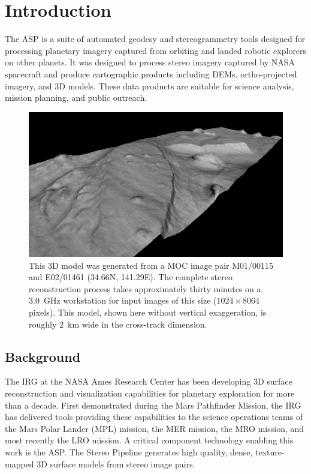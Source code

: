 \chapter{Introduction}

\acresetall

The  \ac{ASP} is a suite of automated geodesy and
stereogrammetry tools designed for processing planetary imagery
captured from orbiting and landed robotic explorers on other planets.
It was designed to process stereo imagery captured by \ac{NASA}
spacecraft and produce cartographic products including \acp{DEM},
ortho-projected imagery, and 3D models.  These data products are
suitable for science analysis, mission planning, and public outreach.

\begin{figure}[tb]
   \centering
   \includegraphics[width=6.5in]{images/introduction/p19view2.png}
   \caption{This 3D model was generated from a \acf{MOC} image
     pair M01/00115 and E02/01461 (34.66N, 141.29E).  The complete
     stereo reconstruction process takes approximately thirty minutes on
     a 3.0~GHz workstation for input images of this size ($1024 \times 8064$
     pixels).  This model, shown here without vertical
     exaggeration, is roughly 2~km wide in the cross-track
     dimension. }
   \label{fig:p19}
\end{figure}

\section{Background}

The \ac{IRG} at the NASA Ames Research Center has been developing
3D surface reconstruction and visualization capabilities for planetary
exploration for more than a decade.  First demonstrated during the
Mars Pathfinder Mission, the \ac{IRG} has delivered tools providing
these capabilities to the science operations teams of the Mars Polar
Lander (MPL) mission, the \ac{MER} mission, the \ac{MRO} mission,
and most recently the \ac{LRO} mission. A critical component
technology enabling this work is the \acf{ASP}.  The Stereo Pipeline
generates high quality, dense, texture-mapped 3D surface models
from stereo image pairs.

